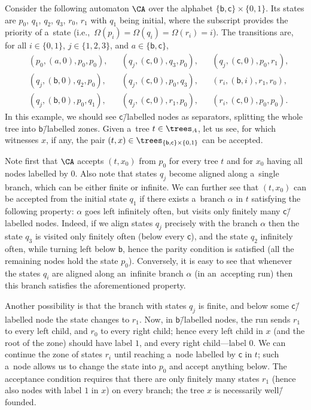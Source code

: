 \documentclass{lmcs}
\numberwithin{equation}{section}
\numberwithin{figure}{section}
\begin{document}
\begin{exa}\label{ex:automaton}
	Consider the following automaton $\CA$ over the alphabet $\{\mathsf{b},\mathsf{c}\}\times\{0,1\}$.
	Its states are $p_0$, $q_1$, $q_2$, $q_3$, $r_0$, $r_1$ with $q_1$ being initial, where the subscript provides the priority of a~state (i.e.,~$\Omega(p_i)=\Omega(q_i)=\Omega(r_i)=i$).
	The transitions are, for all $i\in\{0,1\}$, $j\in\{1,2,3\}$, and $a\in\{\mathsf{b},\mathsf{c}\}$,
	\begin{align*}
		&(p_0,(a,0),p_0,p_0),&		&(q_j,(\mathsf{c},0),q_3,p_0),&	&(q_j,(\mathsf{c},0),p_0,r_1),\\
		&(q_j,(\mathsf{b},0),q_2,p_0),&	&(q_j,(\mathsf{c},0),p_0,q_3),&	&(r_i,(\mathsf{b},i),r_1,r_0),\\
		&(q_j,(\mathsf{b},0),p_0,q_1),&	&(q_j,(\mathsf{c},0),r_1,p_0),&	&(r_i,(\mathsf{c},0),p_0,p_0).
	\end{align*}
	In this example, we should see $\mathsf{c}$\=/labelled nodes as separators, splitting the whole tree into $\mathsf{b}$\=/labelled zones.
	Given a~tree $t\in\trees_A$, let us see, for which witnesses $x$, if any, the pair $(t,x)\in\trees_{\{\mathsf{b},\mathsf{c}\}\times\{0,1\}}$ can be accepted.

	Note first that $\CA$ accepts $(t,x_0)$ from $p_0$ for every tree $t$ and for $x_0$ having all nodes labelled by $0$.
	Also note that states $q_j$ become aligned along a~single branch, which can be either finite or infinite.
	We can further see that $(t,x_0)$ can be accepted from the initial state $q_1$ if there exists a~branch $\alpha$ in $t$ satisfying the following property:
	$\alpha$ goes left infinitely often, but visits only finitely many $\mathsf{c}$\=/labelled nodes.
	Indeed, if we align states $q_j$ precisely with the branch $\alpha$ then the state $q_3$ is visited only finitely often (below every $\mathsf{c}$),
	and the state $q_2$ infinitely often, while turning left below $\mathsf{b}$, hence the parity condition is satisfied
	(all the remaining nodes hold the state $p_0$).
	Conversely, it is easy to see that whenever the states $q_i$ are aligned along an~infinite branch $\alpha$ (in an~accepting run) then this branch satisfies the aforementioned property.

	Another possibility is that the branch with states $q_j$ is finite, and below some $\mathsf{c}$\=/labelled node the state changes to $r_1$.
	Now, in $\mathsf{b}$\=/labelled nodes, the run sends $r_1$ to every left child, and $r_0$ to every right child;
	hence every left child in $x$ (and the root of the zone) should have label $1$, and every right child---label $0$.
	We can continue the zone of states $r_i$ until reaching a~node labelled by $\mathsf{c}$ in $t$;
	such a~node allows us to change the state into $p_0$ and accept anything below.
	The acceptance condition requires that there are only finitely many states $r_1$ (hence also nodes with label $1$ in $x$) on every branch;
	the tree $x$ is necessarily well\=/founded.
	

\end{exa}
\end{document}
